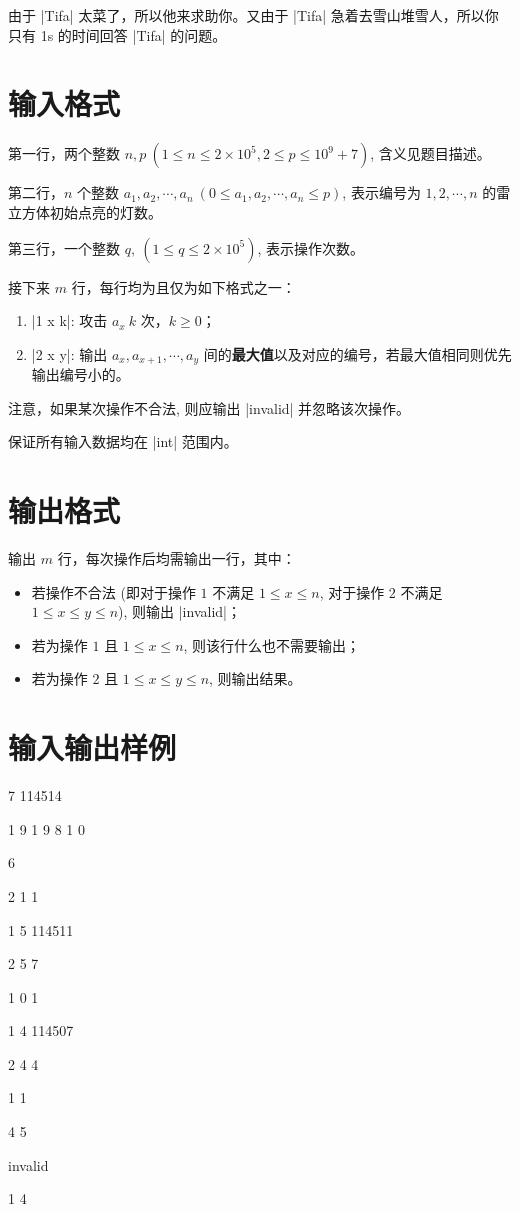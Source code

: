 \documentclass{ctpro}
\begin{document}
由于 |Tifa| 太菜了，所以他来求助你。又由于 |Tifa| 急着去雪山堆雪人，所以你只有 1s 的时间回答 |Tifa| 的问题。

\section*{输入格式}

第一行，两个整数 $n,p~(1 \leq n \leq 2 \times 10^5, 2 \leq p \leq 10^9+7)$, 含义见题目描述。

第二行，$n$ 个整数 $a_1, a_2, \cdots, a_n~(0 \leq a_1, a_2, \cdots, a_n \leq p)$, 表示编号为 $1,2, \cdots, n$ 的雷立方体初始点亮的灯数。

第三行，一个整数 $q,~(1 \leq q \leq 2 \times 10^5)$, 表示操作次数。

接下来 $m$ 行，每行均为且仅为如下格式之一：

\begin{enumerate}
	\item |1 x k|: 攻击 $a_x~k$ 次，$k \geq 0$；
	\item |2 x y|: 输出 $a_x, a_{x+1}, \cdots, a_y$ 间的\textbf{最大值}以及对应的编号，若最大值相同则优先输出编号小的。
\end{enumerate}

注意，如果某次操作不合法, 则应输出 |invalid| 并忽略该次操作。

保证所有输入数据均在 |int| 范围内。

\section*{输出格式}

输出 $m$ 行，每次操作后均需输出一行，其中：

\begin{itemize}
	\item 若操作不合法 (即对于操作 $1$ 不满足 $1 \leq x \leq n$, 对于操作 $2$ 不满足 $1 \leq x \leq y \leq n$), 则输出 |invalid|；
	\item 若为操作 $1$ 且 $1 \leq x \leq n$, 则该行什么也不需要输出；
	\item 若为操作 $2$ 且 $1 \leq x \leq y \leq n$, 则输出结果。
\end{itemize}

\section*{输入输出样例}
\testcasetab
{
	7 114514\par
    1 9 1 9 8 1 0\par
    6\par
    2 1 1\par
    1 5 114511\par
    2 5 7\par
    1 0 1\par
    1 4 114507\par
    2 4 4
}
{
    1 1\par
    \par
    4 5\par
    invalid\par
    \par
    1 4
}
\end{document}
